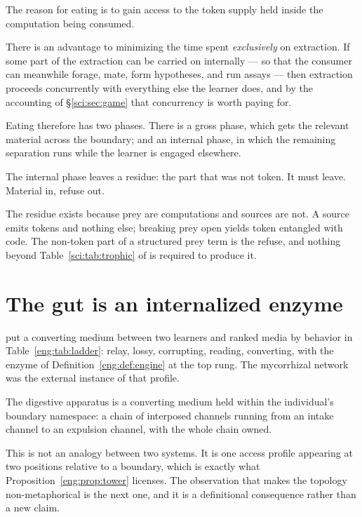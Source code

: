 The reason for eating is to gain access to the token supply held inside the
computation being consumed.

There is an advantage to minimizing the time spent \emph{exclusively} on
extraction. If some part of the extraction can be carried on internally --- so
that the consumer can meanwhile forage, mate, form hypotheses, and run assays
--- then extraction proceeds concurrently with everything else the learner does,
and by the accounting of \S\ref{sci:sec:game} that concurrency is worth paying
for.

Eating therefore has two phases. There is a gross phase, which gets the relevant
material across the boundary; and an internal phase, in which the remaining
separation runs while the learner is engaged elsewhere.

The internal phase leaves a residue: the part that was not token. It must leave.
Material in, refuse out.

\begin{observation}
\label{tub:obs:refuse}
The residue exists because prey are computations and sources are not. A source
emits tokens and nothing else; breaking prey open yields token entangled with
code. The non-token part of a structured prey term is the refuse, and nothing
beyond Table~\ref{sci:tab:trophic} of \chSci is required to produce it.
\end{observation}

\section{The gut is an internalized enzyme}
\label{tub:sec:ident}

\chEng put a converting medium between two learners and ranked media by behavior
in Table~\ref{eng:tab:ladder}: relay, lossy, corrupting, reading, converting,
with the enzyme of Definition~\ref{eng:def:engine} at the top rung. The
mycorrhizal network was the external instance of that profile.

\begin{observation}
\label{tub:obs:gut}
The digestive apparatus is a converting medium held within the individual's
boundary namespace: a chain of interposed channels running from an intake
channel to an expulsion channel, with the whole chain owned.
\end{observation}

This is not an analogy between two systems. It is one access profile appearing
at two positions relative to a boundary, which is exactly what
Proposition~\ref{eng:prop:tower} licenses. The observation that makes the
topology non-metaphorical is the next one, and it is a definitional consequence
rather than a new claim.


